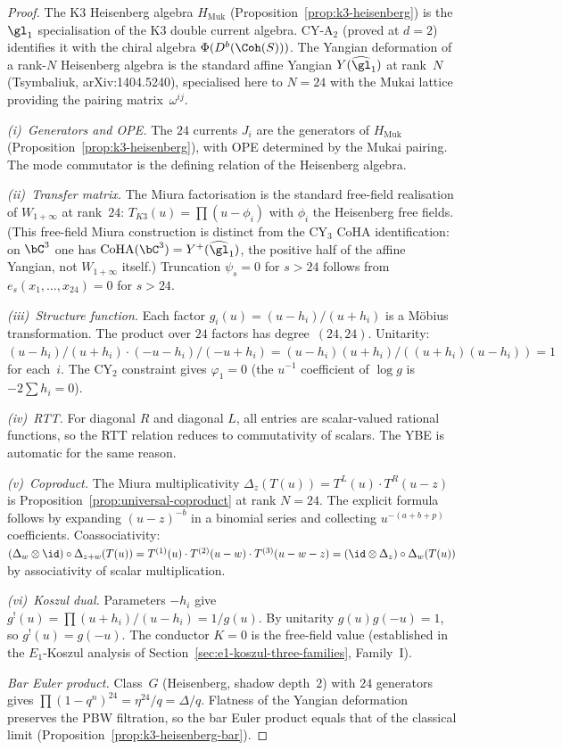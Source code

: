 \begin{proof}
The K3 Heisenberg algebra $H_{\mathrm{Muk}}$
(Proposition~\ref{prop:k3-heisenberg}) is the $\gl_1$
specialisation of the K3 double current algebra.
CY-A$_2$ (proved at $d = 2$) identifies it with the chiral algebra
$\Phi(D^b(\Coh(S)))$.
The Yangian deformation of a rank-$N$ Heisenberg algebra is the
standard affine Yangian $Y(\widehat{\gl}_1)$ at rank~$N$
(Tsymbaliuk, arXiv:1404.5240), specialised here to $N = 24$ with the
Mukai lattice providing the pairing matrix~$\omega^{ij}$.

\emph{(i)~Generators and OPE.}
The $24$ currents $J_i$ are the generators of $H_{\mathrm{Muk}}$
(Proposition~\ref{prop:k3-heisenberg}), with OPE determined by the
Mukai pairing. The mode commutator is the defining relation of the
Heisenberg algebra.

\emph{(ii)~Transfer matrix.}
The Miura factorisation is the standard free-field realisation
of $W_{1+\infty}$ at rank~$24$: $T_{K3}(u) = \prod(u - \phi_i)$
with $\phi_i$ the Heisenberg free fields. (This free-field Miura
construction is distinct from the CY$_3$ CoHA identification: on
$\bC^3$ one has $\mathrm{CoHA}(\bC^3) = Y^+(\widehat{\gl}_1)$, the
positive half of the affine Yangian, not $W_{1+\infty}$ itself.)
Truncation $\psi_s = 0$ for $s > 24$ follows from
$e_s(x_1, \ldots, x_{24}) = 0$ for $s > 24$.

\emph{(iii)~Structure function.}
Each factor $g_i(u) = (u - h_i)/(u + h_i)$ is a M\"obius
transformation. The product over $24$ factors has degree~$(24,24)$.
Unitarity: $(u-h_i)/(u+h_i) \cdot (-u-h_i)/(-u+h_i) =
(u-h_i)(u+h_i)/((u+h_i)(u-h_i)) = 1$ for each~$i$.
The CY$_2$ constraint gives $\varphi_1 = 0$ (the $u^{-1}$ coefficient
of $\log g$ is $-2\sum h_i = 0$).

\emph{(iv)~RTT.}
For diagonal $R$ and diagonal $L$, all entries are scalar-valued
rational functions, so the RTT relation reduces to commutativity
of scalars. The YBE is automatic for the same reason.

\emph{(v)~Coproduct.}
The Miura multiplicativity $\Delta_z(T(u)) = T^L(u) \cdot T^R(u-z)$
is Proposition~\ref{prop:universal-coproduct} at rank $N = 24$.
The explicit formula follows by expanding $(u-z)^{-b}$ in a
binomial series and collecting $u^{-(a+b+p)}$ coefficients.
Coassociativity:
$({\Delta_w \otimes \id}) \circ \Delta_{z+w}(T(u)) =
T^{(1)}(u) \cdot T^{(2)}(u-w) \cdot T^{(3)}(u-w-z) =
({\id \otimes \Delta_z}) \circ \Delta_w(T(u))$
by associativity of scalar multiplication.

\emph{(vi)~Koszul dual.}
Parameters $-h_i$ give $g^!(u) = \prod(u+h_i)/(u-h_i) = 1/g(u)$.
By unitarity $g(u)g(-u) = 1$, so $g^!(u) = g(-u)$.
The conductor $K = 0$ is the free-field value
(established in the $E_1$-Koszul analysis of
Section~\ref{sec:e1-koszul-three-families},
Family~I).

\emph{Bar Euler product.}
Class~$G$ (Heisenberg, shadow depth~$2$) with $24$ generators gives
$\prod(1-q^n)^{24} = \eta^{24}/q = \Delta/q$.
Flatness of the Yangian deformation preserves the PBW filtration,
so the bar Euler product equals that of the classical limit
(Proposition~\ref{prop:k3-heisenberg-bar}).
\end{proof}

